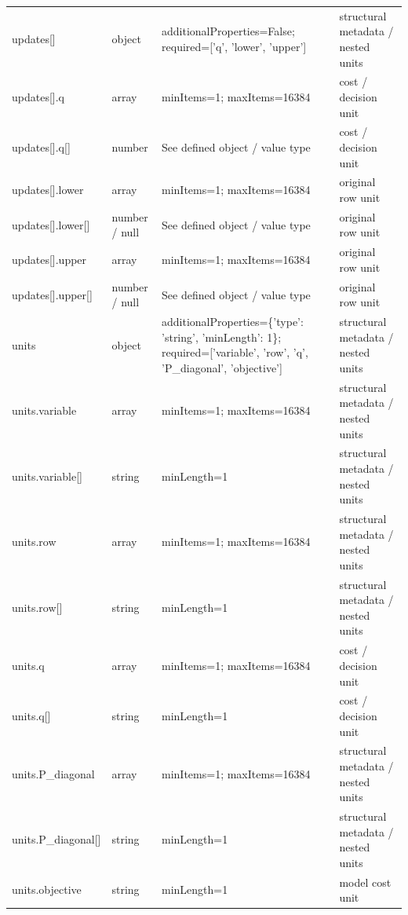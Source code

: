 \begin{longtable}{@{}>{\raggedright\arraybackslash}p{}>{\raggedright\arraybackslash}p{}>{\raggedright\arraybackslash}p{}>{\raggedright\arraybackslash}p{}@{}}
updates[] & object & additionalProperties=\allowbreak{}False; required=\allowbreak{}['q', 'lower', 'upper'] & structural metadata /\allowbreak{} nested units\\
updates[].\allowbreak{}q & array & minItems=\allowbreak{}1; maxItems=\allowbreak{}16384 & cost /\allowbreak{} decision unit\\
updates[].\allowbreak{}q[] & number & See defined object /\allowbreak{} value type & cost /\allowbreak{} decision unit\\
updates[].\allowbreak{}lower & array & minItems=\allowbreak{}1; maxItems=\allowbreak{}16384 & original row unit\\
updates[].\allowbreak{}lower[] & number /\allowbreak{} null & See defined object /\allowbreak{} value type & original row unit\\
updates[].\allowbreak{}upper & array & minItems=\allowbreak{}1; maxItems=\allowbreak{}16384 & original row unit\\
updates[].\allowbreak{}upper[] & number /\allowbreak{} null & See defined object /\allowbreak{} value type & original row unit\\
units & object & additionalProperties=\allowbreak{}\{'type': 'string', 'minLength': 1\}; required=\allowbreak{}['variable', 'row', 'q', 'P\_\allowbreak{}diagonal', 'objective'] & structural metadata /\allowbreak{} nested units\\
units.\allowbreak{}variable & array & minItems=\allowbreak{}1; maxItems=\allowbreak{}16384 & structural metadata /\allowbreak{} nested units\\
units.\allowbreak{}variable[] & string & minLength=\allowbreak{}1 & structural metadata /\allowbreak{} nested units\\
units.\allowbreak{}row & array & minItems=\allowbreak{}1; maxItems=\allowbreak{}16384 & structural metadata /\allowbreak{} nested units\\
units.\allowbreak{}row[] & string & minLength=\allowbreak{}1 & structural metadata /\allowbreak{} nested units\\
units.\allowbreak{}q & array & minItems=\allowbreak{}1; maxItems=\allowbreak{}16384 & cost /\allowbreak{} decision unit\\
units.\allowbreak{}q[] & string & minLength=\allowbreak{}1 & cost /\allowbreak{} decision unit\\
units.\allowbreak{}P\_\allowbreak{}diagonal & array & minItems=\allowbreak{}1; maxItems=\allowbreak{}16384 & structural metadata /\allowbreak{} nested units\\
units.\allowbreak{}P\_\allowbreak{}diagonal[] & string & minLength=\allowbreak{}1 & structural metadata /\allowbreak{} nested units\\
units.\allowbreak{}objective & string & minLength=\allowbreak{}1 & model cost unit\\
\end{longtable}\endgroup
